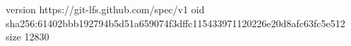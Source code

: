 version https://git-lfs.github.com/spec/v1
oid sha256:61402bbb192794b5d51a659074f3dffc115433971120226e20d8afc63fc5e512
size 12830
